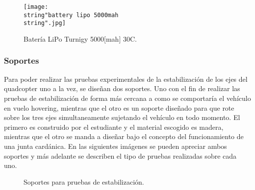 \documentclass[\main/main.tex]{subfiles}
\begin{document}
\begin{figure}[H]
\noindent \begin{centering}
\texttt{[image: \\string"battery lipo 5000mah\\string".jpg]}
\par\end{centering}
\caption{Batería LiPo Turnigy 5000{[}mah{]} 30C.}
\end{figure}

\textcompwordmark{}

\subsubsection{Soportes}

Para poder realizar las pruebas experimentales de la estabilización
de los ejes del quadcopter uno a la vez, se diseñan dos soportes.
Uno con el fin de realizar las pruebas de estabilización de forma
más cercana a como se comportaría el vehículo en vuelo hovering, mientras
que el otro es un soporte diseñado para que rote sobre los tres ejes
simultaneamente sujetando el vehículo en todo momento. El primero
es construido por el estudiante y el material escogido es madera,
mientras que el otro se manda a diseñar bajo el concepto del funcionamiento
de una junta cardánica. En las siguientes imágenes se pueden apreciar
ambos soportes y más adelante se describen el tipo de pruebas realizadas
sobre cada uno. 

\begin{figure}[H]
\noindent \begin{centering}
\par\end{centering}
\caption{Soportes para pruebas de estabilización.}\label{Soporte de Maderita}\noindent
\end{figure}
\end{document}
